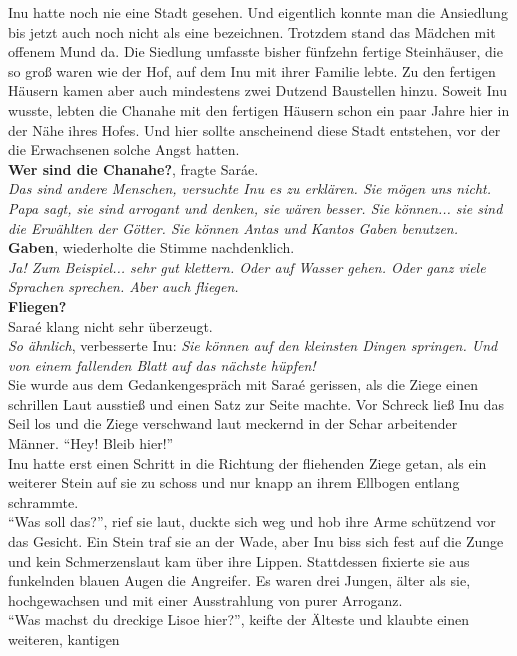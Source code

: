 \documentclass[a4paper,12pt]{book}
\begin{document}
Inu hatte noch nie eine Stadt gesehen. Und eigentlich konnte man die Ansiedlung bis jetzt auch noch 
nicht als eine bezeichnen. Trotzdem stand das Mädchen mit offenem Mund da. Die Siedlung umfasste 
bisher fünfzehn fertige Steinhäuser, die so groß waren wie der Hof, auf dem Inu mit ihrer Familie 
lebte. Zu den fertigen Häusern kamen aber auch mindestens zwei Dutzend Baustellen hinzu. Soweit Inu 
wusste, lebten die Chanahe mit den fertigen Häusern schon ein paar Jahre hier in der Nähe ihres 
Hofes. Und hier sollte anscheinend diese Stadt entstehen, vor der die Erwachsenen solche Angst 
hatten. \\
\textbf{Wer sind die Chanahe?}, fragte Saráe. \\
\textit{Das sind andere Menschen, versuchte Inu es zu erklären. Sie mögen uns nicht. Papa sagt, sie 
sind arrogant und denken, sie wären besser. Sie können... sie sind die Erwählten der Götter. Sie 
können Antas und Kantos Gaben benutzen.}\\
\textbf{Gaben}, wiederholte die Stimme nachdenklich.\\
\textit{Ja! Zum Beispiel... sehr gut klettern. Oder auf Wasser gehen. Oder ganz viele Sprachen 
sprechen. Aber auch fliegen.}\\
\textbf{Fliegen?}\\
Saraé klang nicht sehr überzeugt. \\
\textit{So ähnlich}, verbesserte Inu: \textit{Sie können auf den kleinsten Dingen springen. Und von 
einem fallenden Blatt auf das nächste hüpfen!}\\
Sie wurde aus dem Gedankengespräch mit Saraé gerissen, als die Ziege einen schrillen Laut ausstieß 
und einen Satz zur Seite machte. Vor Schreck ließ Inu das Seil los und die Ziege verschwand laut 
meckernd in der Schar arbeitender Männer. ``Hey! Bleib hier!''\\
Inu hatte erst einen Schritt in die Richtung der fliehenden Ziege getan, als ein weiterer Stein auf 
sie zu schoss und nur knapp an ihrem Ellbogen entlang schrammte. \\
``Was soll das?'', rief sie laut, duckte sich weg und hob ihre Arme schützend vor das Gesicht.
Ein Stein traf sie an der Wade, aber Inu biss sich fest auf die Zunge und kein Schmerzenslaut kam 
über ihre Lippen. Stattdessen fixierte sie aus funkelnden blauen Augen die Angreifer. Es waren drei 
Jungen, älter als sie, hochgewachsen und mit einer Ausstrahlung von purer Arroganz. \\
``Was machst du dreckige Lisoe hier?'', keifte der Älteste und klaubte einen weiteren, kantigen 
\end{document}
